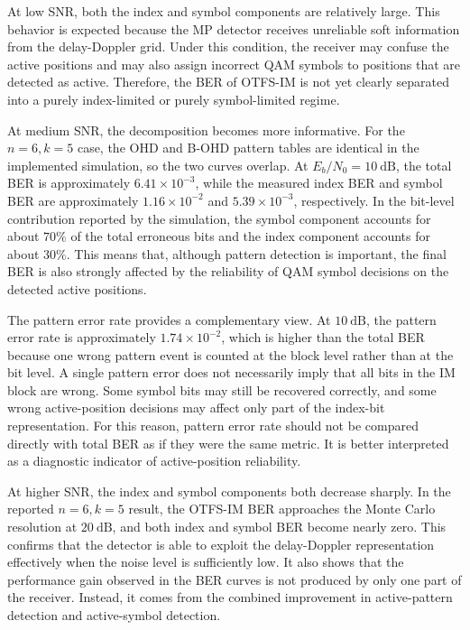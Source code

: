 At low SNR, both the index and symbol components are relatively large. This behavior is expected because the MP detector receives unreliable soft information from the delay-Doppler grid. Under this condition, the receiver may confuse the active positions and may also assign incorrect QAM symbols to positions that are detected as active. Therefore, the BER of OTFS-IM is not yet clearly separated into a purely index-limited or purely symbol-limited regime.

At medium SNR, the decomposition becomes more informative. For the \(n=6,k=5\) case, the OHD and B-OHD pattern tables are identical in the implemented simulation, so the two curves overlap. At \(E_b/N_0=10~\mathrm{dB}\), the total BER is approximately \(6.41\times10^{-3}\), while the measured index BER and symbol BER are approximately \(1.16\times10^{-2}\) and \(5.39\times10^{-3}\), respectively. In the bit-level contribution reported by the simulation, the symbol component accounts for about \(70\%\) of the total erroneous bits and the index component accounts for about \(30\%\). This means that, although pattern detection is important, the final BER is also strongly affected by the reliability of QAM symbol decisions on the detected active positions.

The pattern error rate provides a complementary view. At \(10~\mathrm{dB}\), the pattern error rate is approximately \(1.74\times10^{-2}\), which is higher than the total BER because one wrong pattern event is counted at the block level rather than at the bit level. A single pattern error does not necessarily imply that all bits in the IM block are wrong. Some symbol bits may still be recovered correctly, and some wrong active-position decisions may affect only part of the index-bit representation. For this reason, pattern error rate should not be compared directly with total BER as if they were the same metric. It is better interpreted as a diagnostic indicator of active-position reliability.

At higher SNR, the index and symbol components both decrease sharply. In the reported \(n=6,k=5\) result, the OTFS-IM BER approaches the Monte Carlo resolution at \(20~\mathrm{dB}\), and both index and symbol BER become nearly zero. This confirms that the detector is able to exploit the delay-Doppler representation effectively when the noise level is sufficiently low. It also shows that the performance gain observed in the BER curves is not produced by only one part of the receiver. Instead, it comes from the combined improvement in active-pattern detection and active-symbol detection.

